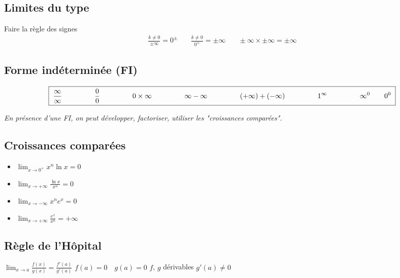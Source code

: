 \documentclass[12]{article}%
\theoremstyle{plain}
\theoremstyle{definition}
\theoremstyle{remark}
\begin{document}
\subsection{Limites du type}
Faire la règle des signes
\[
\boxed{
	\begin{array}{ccc}
		\displaystyle \frac{k \ne 0}{\pm\infty} = 0^\pm &
		\quad \displaystyle \frac{k \ne 0}{0^\pm} = \pm\infty &
		\quad \displaystyle \pm \infty \times \pm \infty = \pm \infty
	\end{array}
}
\]

\subsection{Forme indéterminée (FI)}

\[
\boxed{
	\begin{array}{@{\hskip 3pt} c @{\hskip 6pt} c @{\hskip 6pt} c @{\hskip 6pt} c @{\hskip 6pt} c @{\hskip 6pt} c @{\hskip 6pt} c @{\hskip 3pt}}
		\displaystyle \frac{\infty}{\infty}  \qquad \qquad &
		\displaystyle \frac{0}{0}  \qquad \qquad &
		\displaystyle 0 \times \infty \qquad \qquad &
		\displaystyle \infty - \infty \qquad \qquad &
		\displaystyle (+\infty) + (-\infty) \qquad \qquad &
		\displaystyle 1^\infty \qquad \qquad &
		\displaystyle \infty^0 \qquad 0^0
	\end{array}
}
\]


\textit{En présence d’une FI, on peut développer, factoriser, utiliser les "croissances comparées".}

\subsection{Croissances comparées}

\begin{itemize}
	\item \( \displaystyle \lim_{x \to 0^+} x^n \ln x = 0 \)
	\item \( \displaystyle \lim_{x \to +\infty} \frac{\ln x}{x^n} = 0 \)
	\item \( \displaystyle \lim_{x \to -\infty} x^n e^x = 0 \)
	\item \( \displaystyle \lim_{x \to +\infty} \frac{e^x}{x^n} = +\infty \)
\end{itemize}

\subsection{Règle de l'Hôpital}
\( \displaystyle \lim_{x \to a} \frac{f(x)}{g(x)} = \frac{f'(a)}{g'(a)} \)
\newline
$f(a) = 0 \quad g(a) = 0$
\newline
$f$, $g$ dérivables
\newline
$g'(a) \neq 0$
\end{document}

